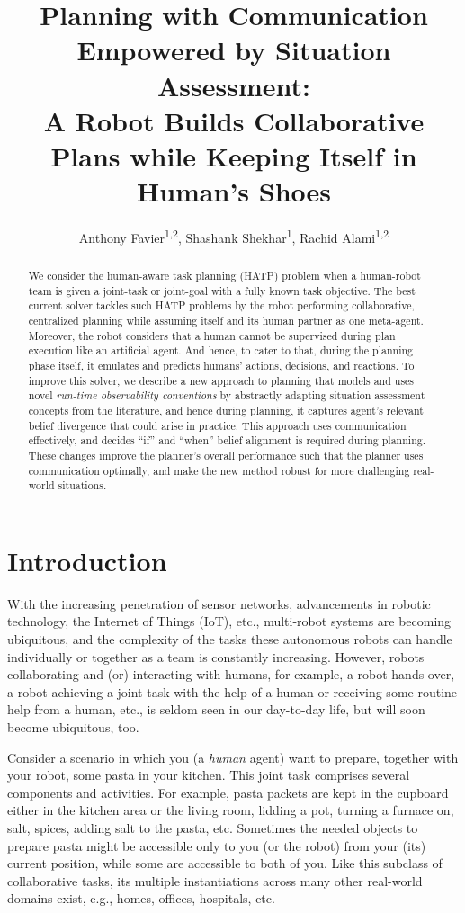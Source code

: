 \documentclass[letterpaper]{article} %
\title
{
Planning with Communication Empowered by Situation Assessment:
\\ 
A Robot Builds Collaborative Plans
while Keeping Itself in Human's Shoes 
}
\author{
    Anthony Favier\textsuperscript{\rm 1,2},
    Shashank Shekhar\textsuperscript{\rm 1},
    Rachid Alami\textsuperscript{\rm 1,2}
}
\begin{document}


\maketitle

\begin{abstract}
We consider the human-aware task planning (HATP) problem when a human-robot team is given a joint-task or joint-goal with a fully known task objective. 
The best current solver tackles such HATP problems by the robot performing collaborative, centralized planning while assuming itself and its human partner as one meta-agent. 
Moreover, the robot considers that a human cannot be supervised during plan execution like an artificial agent. And hence, to cater to that, during the planning phase itself, it emulates and predicts humans' actions, decisions, and reactions. 
To improve this solver, we describe a new approach to planning that models and uses novel {\em run-time observability conventions} by abstractly adapting  situation assessment concepts from the literature, and hence during planning, it captures agent's relevant belief divergence that could arise in practice. 
This approach uses communication effectively, and decides ``if'' and ``when'' belief alignment is required during planning. 
These changes improve the planner's overall performance such that the planner uses communication optimally, and make the new method robust for more challenging real-world situations.  
\end{abstract}

\section{Introduction}
With the increasing penetration of sensor networks, advancements in robotic technology, the Internet of Things (IoT), etc., multi-robot systems are becoming ubiquitous, and the complexity of the tasks these autonomous robots can handle individually or together as a team is constantly increasing.
However, robots collaborating and (or) interacting with humans, for example, a robot hands-over, a robot achieving a joint-task with the help of a human or receiving some routine help from a human, etc., is seldom seen in our day-to-day life, but will soon become ubiquitous, too.

Consider a scenario in which you (a \textit{human} agent) want to prepare, together with your robot, some pasta in your kitchen. This joint task comprises several components and activities. For example, pasta packets are kept in the cupboard either in the kitchen area or the living room, lidding a pot, turning a furnace on, salt, spices, adding salt to the pasta, etc. 
Sometimes the needed objects to prepare pasta might be accessible only to you (or the robot) from your (its) current position, while some are accessible to both of you. 
Like this subclass of collaborative tasks, its multiple instantiations across many other real-world domains exist, e.g., homes, offices, hospitals, etc.
\end{document}
